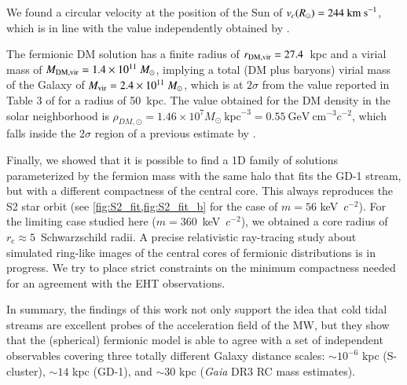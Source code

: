 \documentclass[twocolumn]{aa}
\begin{document}
We found a circular velocity at the position of the Sun of $v_c(R_\odot)= 244~\rm{km~s}^{-1}$, which is in line with the value independently obtained by \citet{2019MNRAS.486.2995M}.

The fermionic DM solution has a finite radius of $r_{\rm{DM,vir}}=27.4$~kpc and a virial mass of
$M_{\rm{DM,vir}}=1.4\times10^{11}~M_\odot$, implying a total (DM plus baryons) virial mass of the Galaxy of $M_{\rm{vir}}= 2.4\times10^{11}~M_\odot$, which is at $2\sigma$ from the value reported in Table 3 of
\citet{2014MNRAS.445.3788G} for a radius of 50~kpc. The value obtained for the DM density in the solar neighborhood is $\rho_{DM,\odot}=1.46\times10^7M_\odot~\mathrm{kpc}^{-3}=0.55~\mathrm{GeV}~\mathrm{cm}^{-3} c^{-2}$, which falls inside the $2\sigma$ region of a previous estimate by \citet{Salucci2010}.

Finally, we showed that it is possible to find a 1D family of solutions parameterized by the fermion mass with the same halo that fits the GD-1 stream, but with a different compactness of the central core. This always reproduces the S2 star orbit (see \cref{fig:S2_fit,fig:S2_fit_b} for the case of $m=56$ keV~$c^{-2}$). For the limiting case studied here ($m=360$~keV~$c^{-2}$), we obtained a core radius of $r_\mathrm{c}\approx5$~Schwarzschild radii.
A precise relativistic ray-tracing study about simulated ring-like images of the central
cores of fermionic distributions is in progress. We try to place strict constraints on the minimum
compactness needed for an agreement with the EHT observations.


In summary, the findings of this work not only support the idea that cold tidal streams are excellent probes of the acceleration field of the MW, but they show that the (spherical) fermionic model is able to agree with a set of independent observables covering three totally different Galaxy distance scales: $\sim 10^{-6}$ kpc (S-cluster), $\sim 14$ kpc (GD-1), and $\sim 30$ kpc ({\it Gaia} DR3 RC mass estimates).


\end{document}
